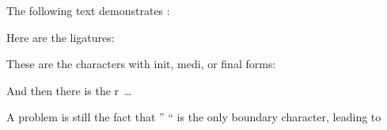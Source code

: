 \documentclass{article}
\begin{document}
\noindent
The following text demonstrates :
\bigskip



\noindent
Here are the ligatures:\par
{}

\noindent
These are the characters with init, medi, or final forms:\par
{}

\noindent
And then there is the r~\ldots\par
{}

\noindent
A problem is still the fact that '' `` is the only boundary character, leading to
\end{document}
